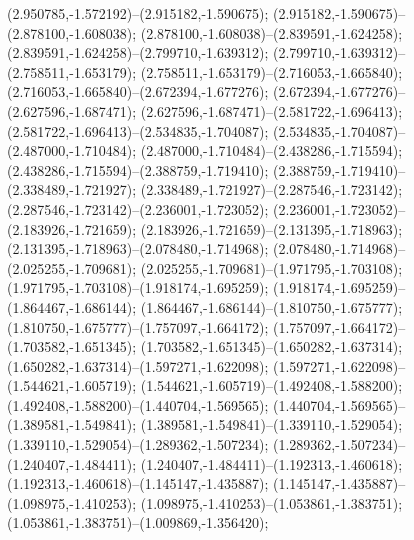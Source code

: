  (2.950785,-1.572192)--(2.915182,-1.590675);
 (2.915182,-1.590675)--(2.878100,-1.608038);
 (2.878100,-1.608038)--(2.839591,-1.624258);
 (2.839591,-1.624258)--(2.799710,-1.639312);
 (2.799710,-1.639312)--(2.758511,-1.653179);
 (2.758511,-1.653179)--(2.716053,-1.665840);
 (2.716053,-1.665840)--(2.672394,-1.677276);
 (2.672394,-1.677276)--(2.627596,-1.687471);
 (2.627596,-1.687471)--(2.581722,-1.696413);
 (2.581722,-1.696413)--(2.534835,-1.704087);
 (2.534835,-1.704087)--(2.487000,-1.710484);
 (2.487000,-1.710484)--(2.438286,-1.715594);
 (2.438286,-1.715594)--(2.388759,-1.719410);
 (2.388759,-1.719410)--(2.338489,-1.721927);
 (2.338489,-1.721927)--(2.287546,-1.723142);
 (2.287546,-1.723142)--(2.236001,-1.723052);
 (2.236001,-1.723052)--(2.183926,-1.721659);
 (2.183926,-1.721659)--(2.131395,-1.718963);
 (2.131395,-1.718963)--(2.078480,-1.714968);
 (2.078480,-1.714968)--(2.025255,-1.709681);
 (2.025255,-1.709681)--(1.971795,-1.703108);
 (1.971795,-1.703108)--(1.918174,-1.695259);
 (1.918174,-1.695259)--(1.864467,-1.686144);
 (1.864467,-1.686144)--(1.810750,-1.675777);
 (1.810750,-1.675777)--(1.757097,-1.664172);
 (1.757097,-1.664172)--(1.703582,-1.651345);
 (1.703582,-1.651345)--(1.650282,-1.637314);
 (1.650282,-1.637314)--(1.597271,-1.622098);
 (1.597271,-1.622098)--(1.544621,-1.605719);
 (1.544621,-1.605719)--(1.492408,-1.588200);
 (1.492408,-1.588200)--(1.440704,-1.569565);
 (1.440704,-1.569565)--(1.389581,-1.549841);
 (1.389581,-1.549841)--(1.339110,-1.529054);
 (1.339110,-1.529054)--(1.289362,-1.507234);
 (1.289362,-1.507234)--(1.240407,-1.484411);
 (1.240407,-1.484411)--(1.192313,-1.460618);
 (1.192313,-1.460618)--(1.145147,-1.435887);
 (1.145147,-1.435887)--(1.098975,-1.410253);
 (1.098975,-1.410253)--(1.053861,-1.383751);
 (1.053861,-1.383751)--(1.009869,-1.356420);

